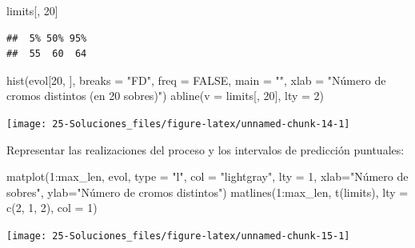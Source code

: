 \documentclass[
]{book}
\newenvironment{Shaded}{\begin{snugshade}}{\end{snugshade}}
\newcommand{\AttributeTok}[1]{\textcolor[rgb]{0.77,0.63,0.00}{#1}}
\newcommand{\ConstantTok}[1]{\textcolor[rgb]{0.00,0.00,0.00}{#1}}
\newcommand{\DecValTok}[1]{\textcolor[rgb]{0.00,0.00,0.81}{#1}}
\newcommand{\FunctionTok}[1]{\textcolor[rgb]{0.00,0.00,0.00}{#1}}
\newcommand{\NormalTok}[1]{#1}
\newcommand{\SpecialCharTok}[1]{\textcolor[rgb]{0.00,0.00,0.00}{#1}}
\newcommand{\StringTok}[1]{\textcolor[rgb]{0.31,0.60,0.02}{#1}}
\theoremstyle{break}
\theoremstyle{nonumberplain}
\begin{document}
\begin{Shaded}
\begin{Highlighting}[]
\NormalTok{limits[, }\DecValTok{20}\NormalTok{]}
\end{Highlighting}
\end{Shaded}

\begin{verbatim}
##  5% 50% 95% 
##  55  60  64
\end{verbatim}

\begin{Shaded}
\begin{Highlighting}[]
\FunctionTok{hist}\NormalTok{(evol[}\DecValTok{20}\NormalTok{, ], }\AttributeTok{breaks =} \StringTok{"FD"}\NormalTok{, }\AttributeTok{freq =} \ConstantTok{FALSE}\NormalTok{,}
     \AttributeTok{main =} \StringTok{""}\NormalTok{, }\AttributeTok{xlab =} \StringTok{"Número de cromos distintos (en 20 sobres)"}\NormalTok{)}
\FunctionTok{abline}\NormalTok{(}\AttributeTok{v =}\NormalTok{ limits[, }\DecValTok{20}\NormalTok{], }\AttributeTok{lty =} \DecValTok{2}\NormalTok{)}
\end{Highlighting}
\end{Shaded}

\begin{center}\texttt{[image: 25-Soluciones\_files/figure-latex/unnamed-chunk-14-1]} \end{center}

Representar las realizaciones del proceso y los intervalos de predicción puntuales:

\begin{Shaded}
\begin{Highlighting}[]
\FunctionTok{matplot}\NormalTok{(}\DecValTok{1}\SpecialCharTok{:}\NormalTok{max\_len, evol, }\AttributeTok{type =} \StringTok{"l"}\NormalTok{, }\AttributeTok{col =} \StringTok{"lightgray"}\NormalTok{, }\AttributeTok{lty =} \DecValTok{1}\NormalTok{,}
    \AttributeTok{xlab=}\StringTok{"Número de sobres"}\NormalTok{, }\AttributeTok{ylab=}\StringTok{"Número de cromos distintos"}\NormalTok{)}
\FunctionTok{matlines}\NormalTok{(}\DecValTok{1}\SpecialCharTok{:}\NormalTok{max\_len, }\FunctionTok{t}\NormalTok{(limits), }\AttributeTok{lty =} \FunctionTok{c}\NormalTok{(}\DecValTok{2}\NormalTok{, }\DecValTok{1}\NormalTok{, }\DecValTok{2}\NormalTok{), }\AttributeTok{col =} \DecValTok{1}\NormalTok{)}
\end{Highlighting}
\end{Shaded}

\begin{center}\texttt{[image: 25-Soluciones\_files/figure-latex/unnamed-chunk-15-1]} \end{center}
\end{document}
